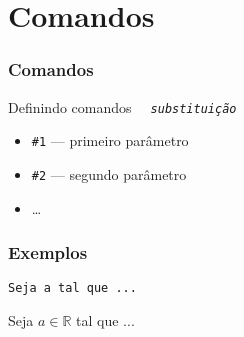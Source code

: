 
\section{Comandos}


\begin{frame}
  \frametitle{Comandos}

  \begin{block}{Definindo comandos}
    \texttt{\mbox{\ \ }\blue{\string\newcommand}\ac{}\red{\textit{\string\comando}}\fc{}\ac{}\textit{substituição}\fc{}}\\

    \begin{itemize}
    \item \texttt{\#1} --- primeiro parâmetro
    \item \texttt{\#2} --- segundo parâmetro
    \item \dots
    \end{itemize}

  \end{block}
\end{frame}

\begin{frame}
  \frametitle{Exemplos}

  \begin{exemplo}
    \medskip\par
    \texttt{\blue{\string\newcommand}\ac{}\green{\string\R}\fc{}\ac{}\fc{}}\medskip



    \bigskip

    \texttt{Seja\ \dolar{}a\string\in\green{\string\R}\dolar{}\ tal\ que\ ...}\smallskip

    \newcommand{\R}{\mathbb{R}}
    Seja $a\in\R$ tal que ...
  \end{exemplo}

\end{frame}


\newcommand{\V}[1]{(#1_1,#1_2)}

